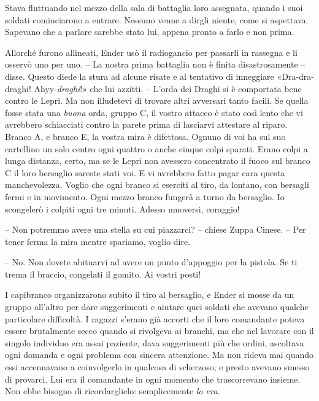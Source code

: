 {Stava fluttuando nel mezzo della sala di battaglia loro assegnata,
	quando i suoi soldati cominciarono a entrare. Nessuno venne a dirgli
	niente, come si aspettava. Sapevano che a parlare sarebbe stato lui,
	appena pronto a farlo e non prima.}

{Allorché furono allineati, Ender usò il radiogancio per passarli in
	rassegna e li osservò uno per uno. -- La nostra prima battaglia non è
	finita disastrosamente -- disse. Questo diede la stura ad alcune risate
	e al tentativo di inneggiare «Dra-dra-draghi! Ahyy-\emph{draghi}!» che
	lui azzitti. -- L'orda dei Draghi si è comportata bene contro le Lepri.
	Ma non illudetevi di trovare altri avversari tanto facili. Se quella
	fosse stata una \emph{buona} orda, gruppo C, il vostro attacco è stato
	così lento che vi avrebbero schiacciati contro la parete prima di
	lasciarvi attestare al riparo. Branco A, e branco E, la vostra mira è
	difettosa. Ognuno di voi ha sul suo cartellino un solo centro ogni
	quattro o anche cinque colpi sparati. Erano colpi a lunga distanza,
	certo, ma se le Lepri non avessero concentrato il fuoco sul branco C il
	loro bersaglio sareste stati voi. E vi avrebbero fatto pagar cara questa
	manchevolezza. Voglio che ogni branco si eserciti al tiro, da lontano,
	con bersagli fermi e in movimento. Ogni mezzo branco fungerà a turno da
	bersaglio. Io scongelerò i colpiti ogni tre minuti. Adesso muoversi,
	coraggio!}

{-- Non potremmo avere una stella su cui piazzarci? -- chiese Zuppa
	Cinese. -- Per tener ferma la mira mentre spariamo, voglio dire.}

{-- No. Non dovete abituarvi ad avere un punto d'appoggio per la
	pistola. Se ti trema il braccio, congelati il gomito. Ai vostri posti!}

{I capibranco organizzarono subito il tiro al bersaglio, e Ender si
	mosse da un gruppo all'altro per dare suggerimenti e aiutare quei
	soldati che avevano qualche particolare difficoltà. I ragazzi s'erano
	già accorti che il loro comandante poteva essere brutalmente secco
	quando si rivolgeva ai branchi, ma che nel lavorare con il singolo
	individuo era assai paziente, dava suggerimenti più che ordini,
	ascoltava ogni domanda e ogni problema con sincera attenzione. Ma non
	rideva mai quando essi accennavano a coinvolgerlo in qualcosa di
	scherzoso, e presto avevano smesso di provarci. Lui era il comandante in
	ogni momento che trascorrevano insieme. Non ebbe bisogno di
	ricordarglielo: semplicemente \emph{lo era.}}

